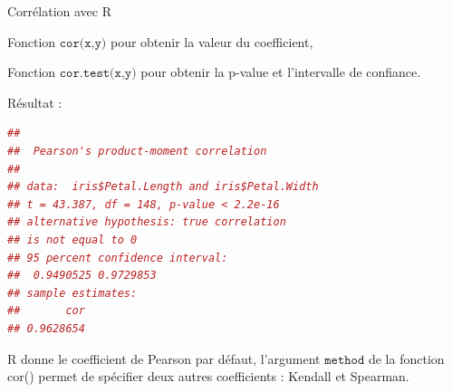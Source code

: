 \documentclass{beamer}
\begin{document}
\begin{frame}[fragile]{Corrélation avec R }


Fonction  $\texttt{cor(x,y)}$  pour obtenir la valeur du coefficient,

Fonction $\texttt{cor.test(x,y)}$ pour obtenir  la \alert{p-value} et \alert{l'intervalle de confiance}. 


Résultat :

\begin{scriptsize}
\begin{spacing}{0.75}
\begin{lstlisting}[language=R,basicstyle=\footnotesize\ttfamily, commentstyle=\ttfamily]
## 
##  Pearson's product-moment correlation
## 
## data:  iris$Petal.Length and iris$Petal.Width
## t = 43.387, df = 148, p-value < 2.2e-16
## alternative hypothesis: true correlation
## is not equal to 0
## 95 percent confidence interval:
##  0.9490525 0.9729853
## sample estimates:
##       cor 
## 0.9628654
\end{lstlisting}
\end{spacing}
\end{scriptsize}








\begin{scriptsize}
\begin{spacing}{0.75}
R donne le coefficient de Pearson par défaut, l’argument  $\texttt{method}$ de la fonction cor() permet de spécifier deux autres coefficients : Kendall et Spearman.
\end{spacing}
\end{scriptsize}

\end{frame}
\end{document}
